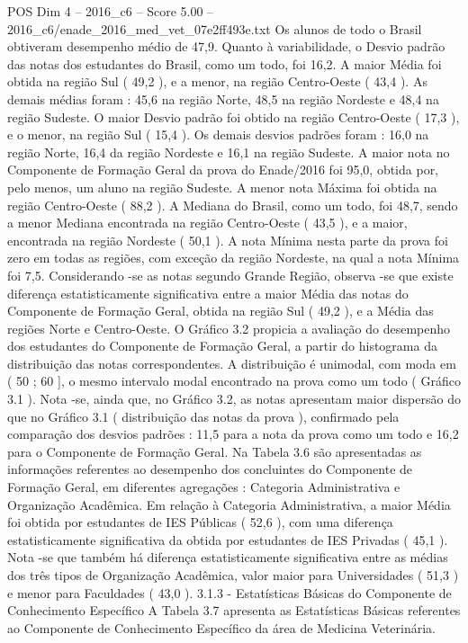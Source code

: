 \begin{textsample}{POS Dim 4 – 2016\_c6 – Score 5.00 – 2016\_c6/enade\_2016\_med\_vet\_07e2ff493e.txt}
Os alunos de todo o Brasil obtiveram desempenho médio de 47,9.
Quanto à variabilidade, o Desvio padrão das notas dos estudantes do Brasil, como um todo, foi 16,2.
A maior Média foi obtida na região Sul ( 49,2 ), e a menor, na região Centro-Oeste ( 43,4 ).
As demais médias foram : 45,6 na região Norte, 48,5 na região Nordeste e 48,4 na região Sudeste.
O maior Desvio padrão foi obtido na região Centro-Oeste ( 17,3 ), e o menor, na região Sul ( 15,4 ).
Os demais desvios padrões foram : 16,0 na região Norte, 16,4 da região Nordeste e 16,1 na região Sudeste.
A maior nota no Componente de Formação Geral da prova do Enade/2016 foi 95,0, obtida por, pelo menos, um aluno na região Sudeste.
A menor nota Máxima foi obtida na região Centro-Oeste ( 88,2 ).
A Mediana do Brasil, como um todo, foi 48,7, sendo a menor Mediana encontrada na região Centro-Oeste ( 43,5 ), e a maior, encontrada na região Nordeste ( 50,1 ).
A nota Mínima nesta parte da prova foi zero em todas as regiões, com exceção da região Nordeste, na qual a nota Mínima foi 7,5.
Considerando -se as notas segundo Grande Região, observa -se que existe diferença estatisticamente significativa entre a maior Média das notas do Componente de Formação Geral, obtida na região Sul ( 49,2 ), e a Média das regiões Norte e Centro-Oeste.
O Gráfico 3.2 propicia a avaliação do desempenho dos estudantes do Componente de Formação Geral, a partir do histograma da distribuição das notas correspondentes.
A distribuição é unimodal, com moda em ( 50 ; 60 ], o mesmo intervalo modal encontrado na prova como um todo ( Gráfico 3.1 ).
Nota -se, ainda que, no Gráfico 3.2, as notas apresentam maior dispersão do que no Gráfico 3.1 ( distribuição das notas da prova ), confirmado pela comparação dos desvios padrões : 11,5 para a nota da prova como um todo e 16,2 para o Componente de Formação Geral.
Na Tabela 3.6 são apresentadas as informações referentes ao desempenho dos concluintes do Componente de Formação Geral, em diferentes agregações : Categoria Administrativa e Organização Acadêmica.
Em relação à Categoria Administrativa, a maior Média foi obtida por estudantes de IES Públicas ( 52,6 ), com uma diferença estatisticamente significativa da obtida por estudantes de IES Privadas ( 45,1 ).
Nota -se que também há diferença estatisticamente significativa entre as médias dos três tipos de Organização Acadêmica, valor maior para Universidades ( 51,3 ) e menor para Faculdades ( 43,0 ). 3.1.3 - Estatísticas Básicas do Componente de Conhecimento Específico A Tabela 3.7 apresenta as Estatísticas Básicas referentes ao Componente de Conhecimento Específico da área de Medicina Veterinária.

\end{textsample}

